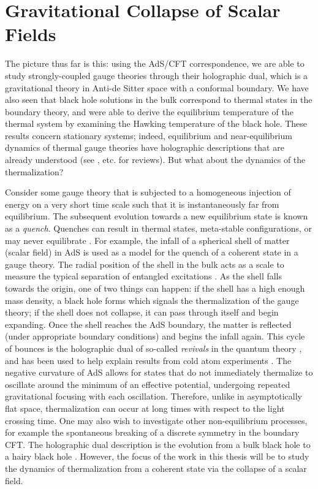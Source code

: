 \documentclass[../PhD.tex]{subfiles}
\begin{document}

\section{Gravitational Collapse of Scalar Fields}
\label{sec: grav collapse}

The picture thus far is this: using the AdS/CFT correspondence, we are able to study strongly-coupled gauge theories through their holographic dual, which is a gravitational theory in Anti-de Sitter space with a conformal boundary. We have also seen that black hole solutions in the bulk correspond to thermal states in the boundary theory, and were able to derive the equilibrium temperature of the thermal system by examining the Hawking temperature of the black hole. These results concern stationary systems; indeed, equilibrium and near-equilibrium dynamics of thermal gauge theories have holographic descriptions that are already understood (see \cite{1101.0618}, etc. for reviews). But what about the dynamics of the thermalization? 

Consider some gauge theory that is subjected to a homogeneous injection of energy on a very short time scale such that it is instantaneously far from equilibrium. The subsequent evolution towards a new equilibrium state is known as a \emph{quench}. Quenches can result in thermal states, meta-stable configurations, or may never equilibrate \cite{1103.2683}. For example, the infall of a spherical shell of matter (scalar field) in AdS is used as a model for the quench of a coherent state in a gauge theory. The radial position of the shell in the bulk acts as a scale to measure the typical separation of entangled excitations \cite{0705.0016}. As the shell falls towards the origin, one of two things can happen: if the shell has a high enough mass density, a black hole forms which signals the thermalization of the gauge theory; if the shell does not collapse, it can pass through itself and begin expanding. Once the shell reaches the AdS boundary, the matter is reflected (under appropriate boundary conditions) and begins the infall again. This cycle of bounces is the holographic dual of so-called \emph{revivals} in the quantum theory \cite{1410.6201, 1412.6002}, and has been used to help explain results from cold atom experiments \cite{Dziarmaga2010, 2011arXiv1106.3567L}. The negative curvature of AdS allows for states that do not immediately thermalize to oscillate around the minimum of an effective potential, undergoing repeated gravitational focusing with each oscillation. Therefore, unlike in asymptotically flat space, thermalization can occur at long times with respect to the light crossing time. One may also wish to investigate other non-equilibrium processes, for example the spontaneous breaking of a discrete symmetry in the boundary CFT. The holographic dual description is the evolution from a bulk black hole to a hairy black hole \cite{1704.05454, 1902.08669}. However, the focus of the work in this thesis will be to study the dynamics of thermalization from a coherent state via the collapse of a scalar field.
\end{document}
